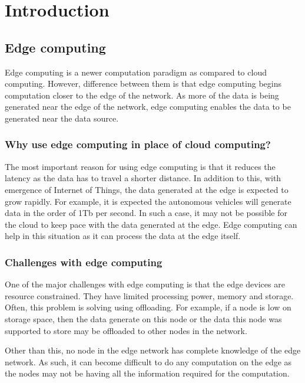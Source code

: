 
\chapter{Introduction}

\graphicspath{{Chapter1/Figs}{Figs}}

\section{Edge computing}

Edge computing is a newer computation paradigm as compared to cloud computing.
However, difference between them is that edge computing begins computation
closer to the edge of the network. As more of the data is being generated near
the edge of the network, edge computing enables the data to be generated near
the data source.
\cite{weisongshiEdgeComputingVision2016}

\subsection{Why use edge computing in place of cloud computing?}

The most important reason for using edge computing is that it reduces the
latency as the data has to travel a shorter distance.
\cite{weisongshiEdgeComputingVision2016} In addition to this, with emergence of
Internet of Things, the data generated at the edge is expected to grow rapidly.
For example, it is expected the autonomous vehicles will generate data in the
order of 1Tb per second. In such a case, it may not be possible for the cloud to
keep pace with the data generated at the edge. Edge computing can help in this
situation as it can process the data at the edge itself.

\subsection{Challenges with edge computing}

One of the major challenges with edge computing is that the edge devices are
resource constrained. They have limited processing power, memory and storage.
Often, this problem is solving using offloading. For example, if a node is low
on storage space, then the data generate on this node or the data this node was
supported to store may be offloaded to other nodes in the network.

Other than this, no node in the edge network has complete knowledge of the edge
network. As such, it can become difficult to do any computation on the edge as
the nodes may not be having all the information required for the computation.

